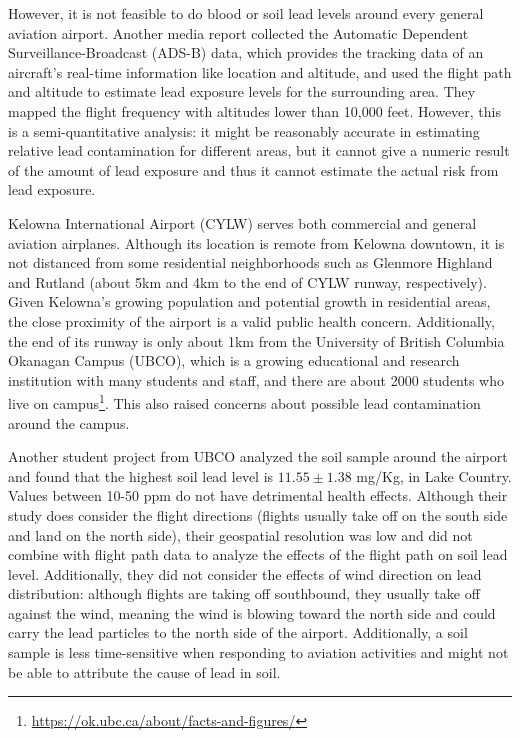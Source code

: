 \documentclass[12pt]{article}
\begin{document}
 However, it is not feasible to do blood or soil lead levels around every general aviation airport. 
 Another media report collected the Automatic Dependent Surveillance-Broadcast (ADS-B) data, which provides the tracking data of an aircraft's real-time information like location and altitude, and used the flight path and altitude to estimate lead exposure levels for the surrounding area. They mapped the flight frequency with altitudes lower than 10,000 feet. \cite{noauthor_you_2022} However, this is a semi-quantitative analysis: it might be reasonably accurate in estimating relative lead contamination for different areas, but it cannot give a numeric result of the amount of lead exposure and thus it cannot estimate the actual risk from lead exposure. 

Kelowna International Airport (CYLW) serves both commercial and general aviation airplanes. Although its location is remote from Kelowna downtown, it is not distanced from some residential neighborhoods such as Glenmore Highland and Rutland (about 5km and 4km to the end of CYLW runway, respectively). Given Kelowna's growing population and potential growth in residential areas, the close proximity of the airport is a valid public health concern. Additionally, the end of its runway is only about 1km from the University of British Columbia Okanagan Campus (UBCO), which is a growing educational and research institution with many students and staff, and there are about 2000 students who live on campus\footnote{\url{https://ok.ubc.ca/about/facts-and-figures/}}. This also raised concerns about possible lead contamination around the campus.

Another student project from UBCO analyzed the soil sample around the airport and found that the highest soil lead level is $11.55\pm 1.38$ mg/Kg, in Lake Country. \cite{citation_error:not_found} Values between 10-50 ppm do not have detrimental health effects. \cite{noauthor_lead_nodate} Although their study does consider the flight directions (flights usually take off on the south side and land on the north side), their geospatial resolution was low and did not combine with flight path data to analyze the effects of the flight path on soil lead level. Additionally, they did not consider the effects of wind direction on lead distribution: although flights are taking off southbound, they usually take off against the wind, meaning the wind is blowing toward the north side and could carry the lead particles to the north side of the airport. \cite{citation_error:not_found} Additionally, a soil sample is less time-sensitive when responding to aviation activities and might not be able to attribute the cause of lead in soil. 
\end{document}
